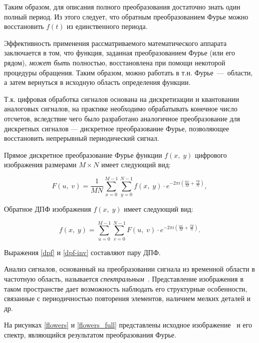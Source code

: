Таким образом, для описания полного преобразования достаточно знать один полный период. Из этого следует, что обратным преобразованием Фурье можно восстановить $f(t)$ из единственного периода.

Эффективность применения рассматриваемого математического аппарата заключается в том, что функция, заданная преобразованием Фурье (или его рядом), \textit{может быть} полностью, восстановлена при помощи некоторой процедуры обращения. Таким образом, можно работать в т.н. Фурье~---~области, а затем вернуться в исходную область определения функции. 

Т.к. цифровая обработка сигналов основана на дискретизации и квантовании аналоговых сигналов, на практике необходимо обрабатывать конечное число отсчетов, вследствие чего было разработано аналогичное преобразование для дискретных сигналов --- дискретное преобразование Фурье, позволяющее восстановить непрерывный периодический сигнал. 

Прямое дискретное преобразование Фурье функции $f(x,\;y)$ цифрового изображения размерами $M\times N$ имеет следующий вид:

\begin{equation}\label{dpf}
	F(u,\;v)= \frac{1}{MN}\sum_{x=0}^{M-1}\sum_{y=0}^{N-1}f(x,\;y)\cdot e^{-2\pi i\textstyle(\frac{ux}{M}+\frac{vy}{N})},
\end{equation}

Обратное ДПФ изображения $f(x,\;y)$ имеет следующий вид:

\begin{equation}\label{dpf-inv}
	f(x,\;y) = \sum_{u=0}^{M-1}\sum_{v=0}^{N-1}F(u,\;v)\cdot e^{-2\pi i\textstyle(\frac{ux}{M}+\frac{vy}{N})}.
\end{equation}

Выражения \ref{dpf} и \ref{dpf-inv} составляют пару ДПФ.

Анализ сигналов, основанный на преобразовании сигнала из временной области в частотную область, называется \textit{спектральным}~\cite{spectrr}. Представление изображения в таком пространстве дает возможность наблюдать его структурные особенности, связанные с периодичностью повторения элементов, наличием мелких деталей и др.

На рисунках \ref{flowers} и \ref{flowers_full} представлены исходное изображение~\cite{flowers} и его спектр, являющийся результатом преобразования Фурье.

